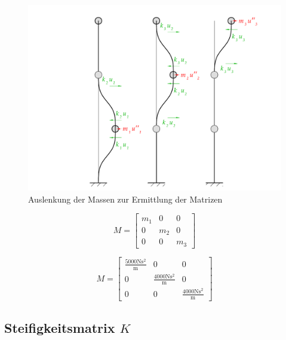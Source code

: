 \documentclass[
  letterpaper,
  DIV=11]{scrreprt}
\begin{document}
\begin{figure}[H]

{\centering \includegraphics{index_files/mediabag/bilder/aufgabe_mms_3er_auslenk.pdf}

}

\caption{\label{fig-mms_3er_steifigkeit}Auslenkung der Massen zur
Ermittlung der Matrizen}

\end{figure}

\begin{equation}M = \left[\begin{matrix}m_{1} & 0 & 0\\0 & m_{2} & 0\\0 & 0 & m_{3}\end{matrix}\right]\end{equation}

\begin{equation}M = \left[\begin{matrix}\frac{5000 \text{N} \text{s}^{2}}{\text{m}} & 0 & 0\\0 & \frac{4000 \text{N} \text{s}^{2}}{\text{m}} & 0\\0 & 0 & \frac{4000 \text{N} \text{s}^{2}}{\text{m}}\end{matrix}\right]\end{equation}

\hypertarget{steifigkeitsmatrix-k}{%
\subsection{\texorpdfstring{Steifigkeitsmatrix
\(K\)}{Steifigkeitsmatrix K}}\label{steifigkeitsmatrix-k}}
\end{document}
